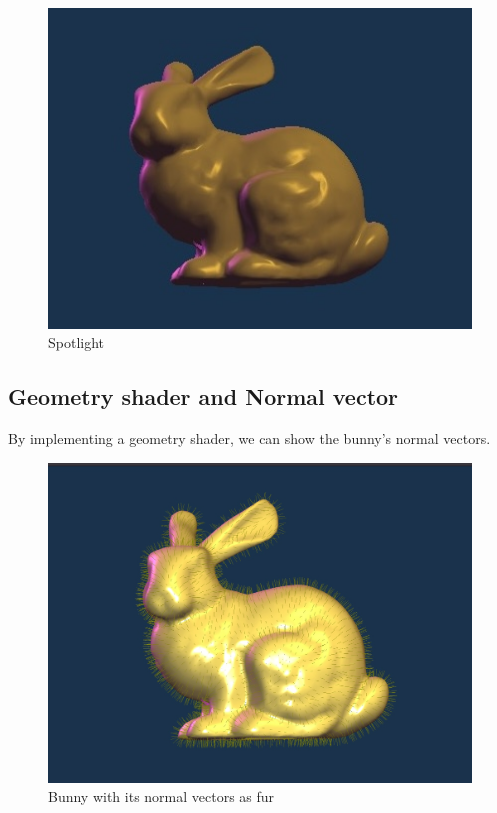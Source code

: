\documentclass[acmtog]{acmart}
\begin{document}
\begin{figure}[h]
{\begin{minipage}[b]{.4\linewidth}
			\includegraphics[scale=0.66]{pictures/outside_spotlight.jpg}
		\end{minipage}
	}
	\caption{Spotlight}
\end{figure}


\pagebreak

\subsection{Geometry shader and Normal vector}

By implementing a geometry shader, we can show the bunny's normal vectors.

\begin{figure}[H]
	\centering
	\includegraphics[scale=0.2]{pictures/fur.jpg}
	\caption{Bunny with its normal vectors as fur}
\end{figure}
\end{document}
